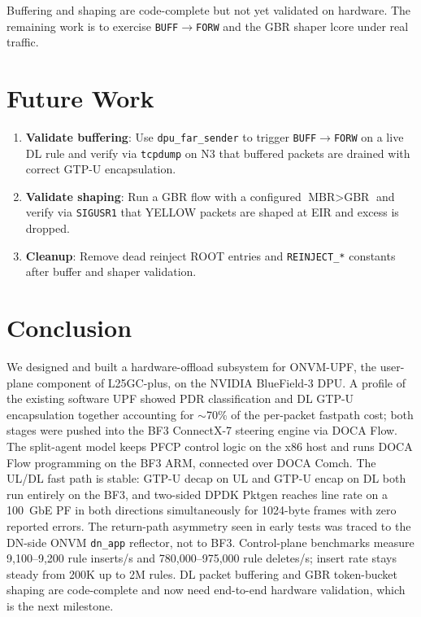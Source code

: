 \documentclass[conference]{IEEEtran}
\newcommand{\code}[1]{\nolinkurl{#1}}
\begin{document}
Buffering and shaping are code-complete but not yet validated on
hardware.  The remaining work is to exercise \texttt{BUFF$\to$FORW}
and the GBR shaper lcore under real traffic.

\section{Future Work}

\begin{enumerate}
  \item \textbf{Validate buffering}: Use \code{dpu_far_sender} to
        trigger \texttt{BUFF$\to$FORW} on a live DL rule and verify via
        \code{tcpdump} on N3 that buffered packets are drained with correct
        GTP-U encapsulation.
  \item \textbf{Validate shaping}: Run a GBR flow with a configured
        $\text{MBR} > \text{GBR}$ and verify via \code{SIGUSR1} that
        YELLOW packets are shaped at EIR and excess is dropped.
  \item \textbf{Cleanup}: Remove dead reinject ROOT entries and
        \code{REINJECT_*} constants after buffer and shaper validation.
\end{enumerate}

\section{Conclusion}

We designed and built a hardware-offload subsystem for ONVM-UPF, the
user-plane component of L25GC-plus, on the NVIDIA BlueField-3 DPU.
A profile of the existing software UPF showed PDR classification and
DL GTP-U encapsulation together accounting for $\sim$70\% of the
per-packet fastpath cost; both stages were pushed into the BF3
ConnectX-7 steering engine via DOCA Flow.  The split-agent model
keeps PFCP control logic on the x86 host and runs DOCA Flow
programming on the BF3 ARM, connected over DOCA Comch.  The UL/DL
fast path is stable: GTP-U decap on UL and GTP-U encap on DL both
run entirely on the BF3, and two-sided DPDK Pktgen reaches line rate
on a 100~GbE PF in both directions simultaneously for 1024-byte
frames with zero reported errors.  The return-path asymmetry seen in
early tests was traced to the DN-side ONVM \code{dn_app} reflector,
not to BF3.  Control-plane benchmarks measure 9{,}100--9{,}200 rule
inserts/s and 780{,}000--975{,}000 rule deletes/s; insert rate stays
steady from 200K up to 2M rules.  DL packet buffering and GBR
token-bucket shaping are code-complete and now need end-to-end
hardware validation, which is the next milestone.
\end{document}
